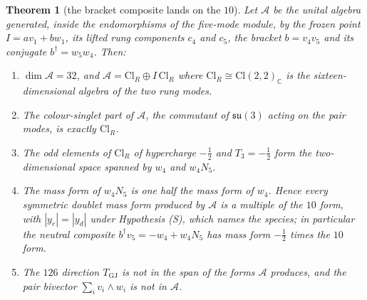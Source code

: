 \documentclass[11pt]{article}
\newtheorem{theorem}{Theorem}[section]
\theoremstyle{definition}
\newcommand{\Cl}{\mathrm{Cl}}
\newcommand{\C}{\mathbb{C}}
\newcommand{\su}{\mathfrak{su}}
\begin{document}
\begin{theorem}[the bracket composite lands on the $10$]\label{thm:bracketnogo}
Let $\mathcal{A}$ be the unital algebra generated, inside the endomorphisms of the five-mode module, by the frozen point $I = av_{1} + bw_{1}$, its lifted rung components $c_{4}$ and $c_{5}$, the bracket $b = v_{4}v_{5}$ and its conjugate $b^{\dagger} = w_{5}w_{4}$. Then:
\begin{enumerate}
\item[(i)] $\dim \mathcal{A} = 32$, and $\mathcal{A} = \Cl_{R} \oplus I\,\Cl_{R}$ where $\Cl_{R} \cong \Cl(2,2)_{\C}$ is the sixteen-dimensional algebra of the two rung modes.
\item[(ii)] The colour-singlet part of $\mathcal{A}$, the commutant of $\su(3)$ acting on the pair modes, is exactly $\Cl_{R}$.
\item[(iii)] The odd elements of $\Cl_{R}$ of hypercharge $-\tfrac12$ and $T_{3} = -\tfrac12$ form the two-dimensional space spanned by $w_{4}$ and $w_{4}N_{5}$.
\item[(iv)] The mass form of $w_{4}N_{5}$ is one half the mass form of $w_{4}$. Hence every symmetric doublet mass form produced by $\mathcal{A}$ is a multiple of the $10$ form, with $|y_{e}| = |y_{d}|$ under Hypothesis (S), which names the species; in particular the neutral composite $b^{\dagger}v_{5} = -w_{4} + w_{4}N_{5}$ has mass form $-\tfrac12$ times the $10$ form.
\item[(v)] The $126$ direction $T_{\mathrm{GJ}}$ is not in the span of the forms $\mathcal{A}$ produces, and the pair bivector $\sum_{i} v_{i} \wedge w_{i}$ is not in $\mathcal{A}$.
\end{enumerate}
\end{theorem}
\end{document}
